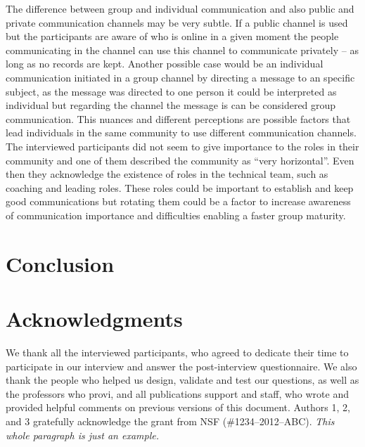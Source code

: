 \documentclass{sigchi}
\begin{document}
The difference between group and individual communication and also public and private communication channels may be very subtle. If a public channel is used but the participants are aware of who is online in a given moment the people communicating in the channel can use this channel to communicate privately – as long as no records are kept. Another possible case would be an individual communication initiated in a group channel by directing a message to an specific subject, as the message was directed to one person it could be interpreted as individual but regarding the channel the message is can be considered group communication. This nuances and different perceptions are possible factors that lead individuals in the same community to use different communication channels. 
The interviewed participants did not seem to give importance to the roles in their community and one of them described the community as ``very horizontal''. Even then they acknowledge the existence of roles in the technical team, such as coaching and leading roles. These roles could be important to establish and keep good communications but rotating them could be a factor to increase awareness of communication importance and difficulties enabling a faster group maturity.

\section{Conclusion}



\section{Acknowledgments}

We thank all the interviewed participants, who agreed to dedicate their time to participate in our interview and answer the post-interview questionnaire. We also thank the people who helped us design, validate and test our questions, as well as the professors who provi, and all publications support
and staff, who wrote and provided helpful comments on previous
versions of this document. Authors 1, 2, and 3 gratefully acknowledge
the grant from NSF (\#1234--2012--ABC). \textit{This whole paragraph is
  just an example.}


%
%
%
%
%
\balance{}



\end{document}
